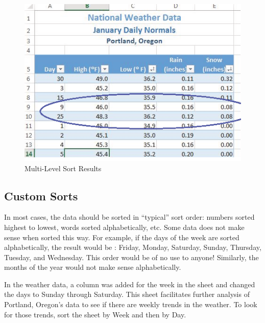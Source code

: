 \begin{figure}[H]
	\centering
	\includegraphics[width=\maxwidth{.95\linewidth}]{gfx/ch05_fig12}
	\caption{Multi-Level Sort Results}
	\label{05:fig12}
\end{figure}

\subsection{Custom Sorts}

In most cases, the data should be sorted in ``typical'' sort order: numbers sorted highest to lowest, words sorted alphabetically, etc. Some data does not make sense when sorted this way. For example, if the days of the week are sorted alphabetically, the result would be : Friday, Monday, Saturday, Sunday, Thursday, Tuesday, and Wednesday. This order would be of no use to anyone! Similarly, the months of the year would not make sense alphabetically.

In the weather data, a column was added for the week in the  sheet and changed the days to Sunday through Saturday. This sheet facilitates further analysis of Portland, Oregon's data to see if there are weekly trends in the weather. To look for those trends, sort the  sheet by Week and then by Day.

